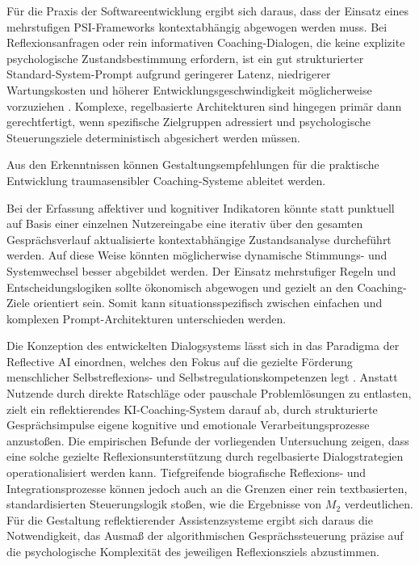 Für die Praxis der Softwareentwicklung ergibt sich daraus, dass der 
Einsatz eines mehrstufigen PSI-Frameworks kontextabhängig abgewogen werden muss. Bei Reflexionsanfragen oder rein informativen Coaching-Dialogen, die 
keine explizite psychologische Zustandsbestimmung erfordern, ist ein gut strukturierter 
Standard-System-Prompt aufgrund geringerer Latenz, niedrigerer Wartungskosten und 
höherer Entwicklungsgeschwindigkeit möglicherweise vorzuziehen \citep{chen2023frugalgpt}. Komplexe, regelbasierte Architekturen 
sind hingegen primär dann gerechtfertigt, wenn spezifische Zielgruppen adressiert und psychologische Steuerungsziele deterministisch abgesichert werden müssen.

Aus den Erkenntnissen können Gestaltungsempfehlungen für die praktische Entwicklung traumasensibler Coaching-Systeme ableitet werden.

Bei der Erfassung affektiver und kognitiver Indikatoren könnte statt punktuell auf 
Basis einer einzelnen Nutzereingabe eine iterativ über den 
gesamten Gesprächsverlauf aktualisierte kontextabhängige Zustandsanalyse durcheführt werden.
Auf diese Weise könnten möglicherwise dynamische Stimmungs- und Systemwechsel besser abgebildet werden.
Der Einsatz mehrstufiger Regeln und Entscheidungslogiken sollte ökonomisch abgewogen und gezielt 
an den Coaching-Ziele orientiert sein. Somit kann situationsspezifisch zwischen einfachen und komplexen Prompt-Architekturen unterschieden werden.

Die Konzeption des entwickelten Dialogsystems lässt sich in das Paradigma der Reflective AI einordnen, welches den Fokus auf die gezielte Förderung menschlicher Selbstreflexions- und Selbstregulationskompetenzen legt \citep{reflectai2025}. Anstatt Nutzende durch direkte Ratschläge oder pauschale Problemlösungen zu entlasten, zielt ein reflektierendes KI-Coaching-System darauf ab, durch strukturierte Gesprächsimpulse eigene kognitive und emotionale Verarbeitungsprozesse anzustoßen. Die empirischen Befunde der vorliegenden Untersuchung zeigen, dass eine solche gezielte Reflexionsunterstützung durch regelbasierte Dialogstrategien operationalisiert werden kann. Tiefgreifende biografische Reflexions- und Integrationsprozesse können jedoch auch an die Grenzen einer rein textbasierten, standardisierten Steuerungslogik stoßen, wie die Ergebnisse von $M_2$ verdeutlichen. Für die Gestaltung reflektierender Assistenzsysteme ergibt sich daraus die Notwendigkeit, das Ausmaß der algorithmischen Gesprächssteuerung präzise auf die psychologische Komplexität des jeweiligen Reflexionsziels abzustimmen.


